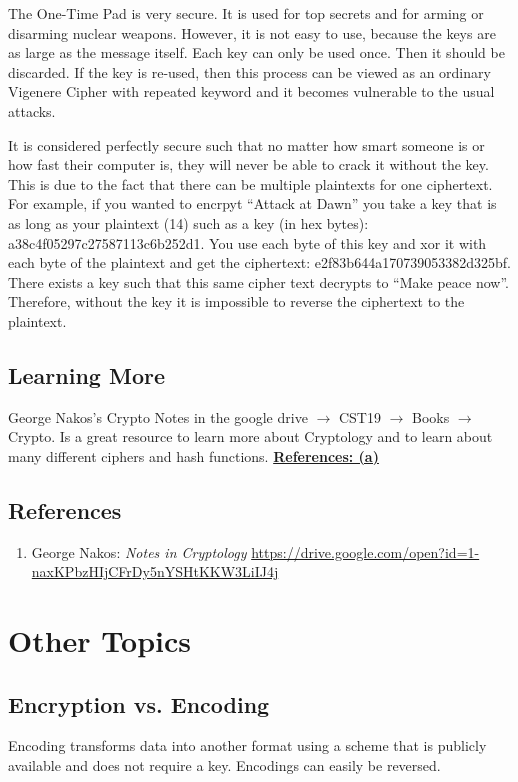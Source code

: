 \documentclass{report}
\begin{document}
The One-Time Pad is very secure. It is used for top secrets and for arming or disarming nuclear
weapons. However, it is not easy to use, because the keys are as large as the message itself. 
Each key can only be used once. Then it should be discarded. If the key is re-used, then this 
process can be viewed as an ordinary Vigenere Cipher with repeated keyword and it becomes 
vulnerable to the usual attacks.

It is considered perfectly secure such that no matter how smart someone is or how fast their
computer is, they will never be able to crack it without the key.  This is due to the fact 
that there can be multiple plaintexts for one ciphertext.  For example, if you wanted to 
encrpyt ``Attack at Dawn'' you take a key that is as long as your plaintext (14) such as 
a key (in hex bytes): a38c4f05297c27587113c6b252d1.  You use each byte of this key and xor it
with each byte of the plaintext and get the ciphertext: e2f83b644a170739053382d325bf.  There 
exists a key such that this same cipher text decrypts to ``Make peace now''.  Therefore, without
the key it is impossible to reverse the ciphertext to the plaintext. 

\section{Learning More}
George Nakos's Crypto Notes in the google drive $\rightarrow$ CST19 $\rightarrow$ Books 
$\rightarrow$ Crypto.  Is a great resource to learn more about Cryptology and to learn
about many different ciphers and hash functions.
\hyperref[ref:4]{\textbf{References: (a)}}

\vspace{1cm}
\section{References}
\label{ref:4}
\begin{enumerate}[label=(\alph*)]
\item George Nakos: \textit{Notes in Cryptology} \url{https://drive.google.com/open?id=1-naxKPbzHIjCFrDy5nYSHtKKW3LiIJ4j}
\end{enumerate}

\chapter{Other Topics}

\section{Encryption vs. Encoding}
\color{blue} Encoding \color{black} transforms data into another format using a scheme that is publicly available and does not require a key.  Encodings can easily be reversed. 
\end{document}

